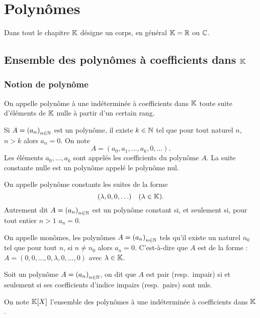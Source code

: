\chapter{Polynômes}\label{chap:polynomes}
\minitoc%
\minilof%
\minilot%

Dans tout le chapitre \(\mathbb{K}\) désigne un corps, en général \(\mathbb{K} = \mathbb{R}\) ou \(\mathbb{C}\).

\section{Ensemble des polynômes à coefficients dans \(\mathbb{K}\)}

\subsection{Notion de polynôme}

\begin{defdef}
  On appelle polynôme à une indéterminée à coefficients dans \(\mathbb{K}\) toute suite
  d'éléments de \(\mathbb{K}\) nulle à partir d'un certain rang.
\end{defdef}

Si \(A = {(a_n)}_{n \in \mathbb{N}}\) est un polynôme, il existe \(k \in \mathbb{N}\) tel que pour
tout naturel \(n\), \(n > k\) alors \(a_n = 0\). On note
\begin{equation}
  A = (a_0, a_1, \ldots, a_k, 0, \ldots).
\end{equation}
Les éléments \(a_0, \ldots, a_k\) sont appelés les coefficients du polynôme
\(A\). La suite constante nulle est un polynôme appelé le polynôme nul.

On appelle polynôme constants les suites de la forme
\begin{equation}
  (\lambda, 0, 0, \ldots) \quad (\lambda \in \mathbb{K}).
\end{equation}
Autrement dit \(A = {(a_n)}_{n \in \mathbb{N}}\) est un polynôme constant si, et seulement
si, pour tout entier \(n > 1\) \(a_n = 0\).

On appelle monômes, les polynômes \(A = {(a_n)}_{n \in \mathbb{N}}\) tels qu'il existe un
naturel \(n_0\) tel que pour tout \(n\), si \(n \neq n_0\) alors \(a_n = 0\).
C'est-à-dire que \(A\) est de la forme : \(A = (0, 0, \ldots, 0,\lambda,0, \ldots,
0)\) avec \(\lambda \in \mathbb{K}\).

Soit un polynôme \(A = {(a_n)}_{n \in \mathbb{N}}\), on dit que \(A\) est pair (resp.\
impair) si et seulement si ses coefficients d'indice impairs (resp.\ pairs) sont
nuls.

On note \(\mathbb{K}[X]\) l'ensemble des polynômes à une indéterminée à coefficients
dans \(\mathbb{K}\).

